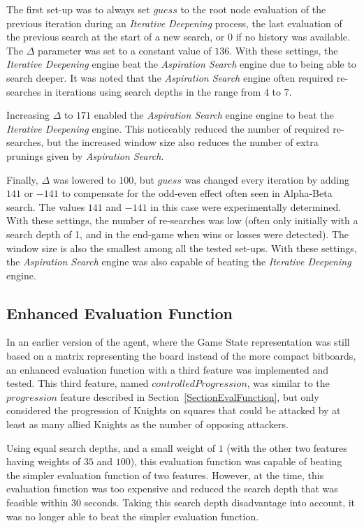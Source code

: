 \documentclass{article}
\newcommand{\refsection}[1]{Section~\ref{#1}}
\begin{document}
The first set-up was to always set $guess$ to the root node evaluation of the previous iteration during an \emph{Iterative Deepening} process, the last evaluation of the previous search at the start of a new search, or $0$ if no history was available. The $\Delta$ parameter was set to a constant value of $136$. With these settings, the \emph{Iterative Deepening} engine beat the \emph{Aspiration Search} engine due to being able to search deeper. It was noted that the \emph{Aspiration Search} engine often required re-searches in iterations using search depths in the range from $4$ to $7$.

Increasing $\Delta$ to $171$ enabled the \emph{Aspiration Search} engine engine to beat the \emph{Iterative Deepening} engine. This noticeably reduced the number of required re-searches, but the increased window size also reduces the number of extra prunings given by \emph{Aspiration Search}.

Finally, $\Delta$ was lowered to $100$, but $guess$ was changed every iteration by adding $141$ or $-141$ to compensate for the odd-even effect often seen in Alpha-Beta search. The values $141$ and $-141$ in this case were experimentally determined. With these settings, the number of re-searches was low (often only initially with a search depth of 1, and in the end-game when wins or losses were detected). The window size is also the smallest among all the tested set-ups. With these settings, the \emph{Aspiration Search} engine was also capable of beating the \emph{Iterative Deepening} engine.

\subsection{Enhanced Evaluation Function}
In an earlier version of the agent, where the Game State representation was still based on a matrix representing the board instead of the more compact bitboards, an enhanced evaluation function with a third feature was implemented and tested. This third feature, named $controlledProgression$, was similar to the $progression$ feature described in \refsection{SectionEvalFunction}, but only considered the progression of Knights on squares that could be attacked by at least as many allied Knights as the number of opposing attackers. 

Using equal search depths, and a small weight of $1$ (with the other two features having weights of $35$ and $100$), this evaluation function was capable of beating the simpler evaluation function of two features. However, at the time, this evaluation function was too expensive and reduced the search depth that was feasible within 30 seconds. Taking this search depth disadvantage into account, it was no longer able to beat the simpler evaluation function.
\end{document}
